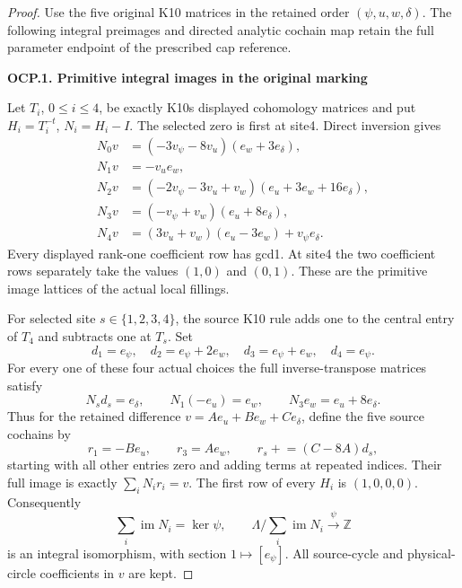 \begin{proof}
Use the five original K10 matrices in the retained order
\((\psi,u,w,\delta)\). The following integral preimages
and directed analytic cochain map retain the full
parameter endpoint of the prescribed cap reference.

\par

\medskip\noindent\textbf{OCP.1. Primitive integral images in the original marking}

\par\nobreak

Let \(T_i\), \(0\leq i\leq4\), be exactly K10\textquotesingle s displayed cohomology
matrices and put \(H_i=T_i^{-t}\), \(N_i=H_i-I\). The selected zero is
first at site4. Direct inversion gives
\[
\begin{aligned}
N_0v&=(-3v_\psi-8v_u)(e_w+3e_\delta),\\
N_1v&=-v_u e_w,\\
N_2v&=(-2v_\psi-3v_u+v_w)(e_u+3e_w+16e_\delta),\\
N_3v&=(-v_\psi+v_w)(e_u+8e_\delta),\\
N_4v&=(3v_u+v_w)(e_u-3e_w)+v_\psi e_\delta.
\end{aligned}
\tag{OCP.1}
\]
Every displayed rank-one coefficient row has gcd1. At site4 the two
coefficient rows separately take the values \((1,0)\) and \((0,1)\).
These are the primitive image lattices of the actual local fillings.

For selected site \(s\in\{1,2,3,4\}\), the source K10 rule adds one to
the central entry of \(T_4\) and subtracts one at \(T_s\). Set
\[
d_1=e_\psi,\quad d_2=e_\psi+2e_w,\quad
d_3=e_\psi+e_w,\quad d_4=e_\psi.
\tag{OCP.2}
\]
For every one of these four actual choices the full inverse-transpose
matrices satisfy
\[
N_s d_s=e_\delta,\qquad N_1(-e_u)=e_w,
\qquad N_3e_w=e_u+8e_\delta.
\tag{OCP.3}
\]
Thus for the retained difference
\(v=Ae_u+Be_w+Ce_\delta\), define the five source cochains by
\[
r_1=-Be_u,\qquad r_3=Ae_w,\qquad
r_s\mathrel{+}=(C-8A)d_s,
\tag{OCP.4}
\]
starting with all other entries zero and adding terms at repeated
indices. Their full image is exactly \(\sum_iN_ir_i=v\).
The first row of every \(H_i\) is \((1,0,0,0)\). Consequently
\[
\sum_i\operatorname{im}N_i=\ker\psi,\qquad
\Lambda/\sum_i\operatorname{im}N_i\xrightarrow{\ \psi\ }\mathbb Z
\tag{OCP.5}
\]
is an integral isomorphism, with section \(1\mapsto[e_\psi]\).
All source-cycle and physical-circle coefficients in \(v\) are kept.

\par


\end{proof}
